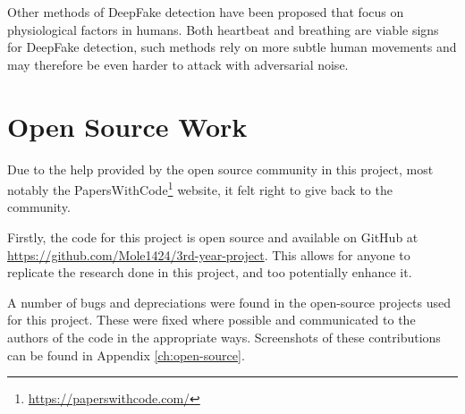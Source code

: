 Other methods of DeepFake detection have been proposed that focus on physiological factors in humans. Both heartbeat\cite{qi2020deeprhythm}\cite{hernandez2020deepfakeson} and breathing\cite{layton2024every} are viable signs for DeepFake detection, such methods rely on more subtle human movements and may therefore be even harder to attack with adversarial noise.

\section{Open Source Work}


Due to the help provided by the open source community in this project, most notably the PapersWithCode\footnote{\url{https://paperswithcode.com/}} website, it felt right to give back to the community. 

Firstly, the code for this project is open source and available on GitHub at \url{https://github.com/Mole1424/3rd-year-project}. This allows for anyone to replicate the research done in this project, and too potentially enhance it. 

A number of bugs and depreciations were found in the open-source projects used for this project. These were fixed where possible and communicated to the authors of the code in the appropriate ways. Screenshots of these contributions can be found in Appendix \ref{ch:open-source}.